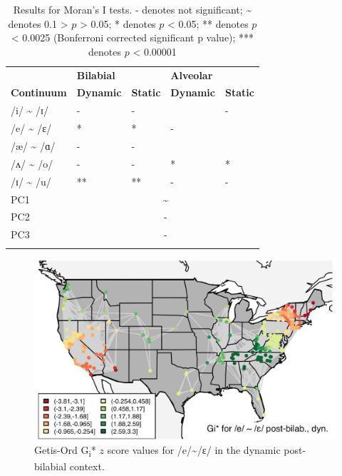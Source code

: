 \documentclass[output=paper]{LSP/langsci}
\begin{document}
\begin{table}
\begin{tabular}{lllll}
\lsptoprule
& {\bfseries Bilabial} &  & {\bfseries Alveolar} & \\
\cmidrule(lr){2-3}\cmidrule(lr){4-5}
{\bfseries Continuum} & {\bfseries Dynamic} & {\bfseries Static} & {\bfseries Dynamic} & {\bfseries Static}\\
\midrule
{\mdseries /i/ {\textasciitilde} /ɪ/} & {\mdseries {}-} & {\mdseries {}-} & {\mdseries {\textasciitilde}} & {\mdseries {}-}\\
{\mdseries /e/ {\textasciitilde} /ɛ/ } & {\mdseries ** } & {\mdseries **} & {\mdseries {}-} & {\mdseries *}\\
{\mdseries /æ/ {\textasciitilde} /ɑ/ } & {\mdseries {}-} & {\mdseries {}-} & {\mdseries {\textasciitilde}} & {\mdseries *}\\
{\mdseries  /ʌ/ {\textasciitilde} /o/} & {\mdseries {}-} & {\mdseries {}-} & {\mdseries **} & {\mdseries **}\\
{\mdseries /ɪ/ {\textasciitilde} /u/} & {\mdseries ***} & {\mdseries ***} & {\mdseries {}-} & {\mdseries {}-}\\
\midrule
{\mdseries PC1} & \multicolumn{4}{c}{ {\textasciitilde}\par}\\
{\mdseries PC2} & \multicolumn{4}{c}{ {}-\par}\\
{\mdseries PC3} & \multicolumn{4}{c}{ {}-\par}\\
\lspbottomrule
\end{tabular}
\caption{Results for Moran’s I tests. {}- denotes not significant; {\textasciitilde} denotes 0.1 {\textgreater} $p$ {\textgreater} 0.05; * denotes $p$ {\textless} 0.05; ** denotes $p$ {\textless} 0.0025 (Bonferroni corrected significant p value); *** denotes $p$ {\textless} 0.00001}
\label{tab:2}
\end{table}

 
\begin{figure}
\includegraphics[width=\textwidth]{illustrations/kend_frid_fig3}
\caption{Getis-Ord G\textsubscript{i}* $z$ score values for /e/{\textasciitilde}/ɛ/ in the dynamic post-bilabial context.}
\label{fig:3}
\end{figure}
\end{document}
